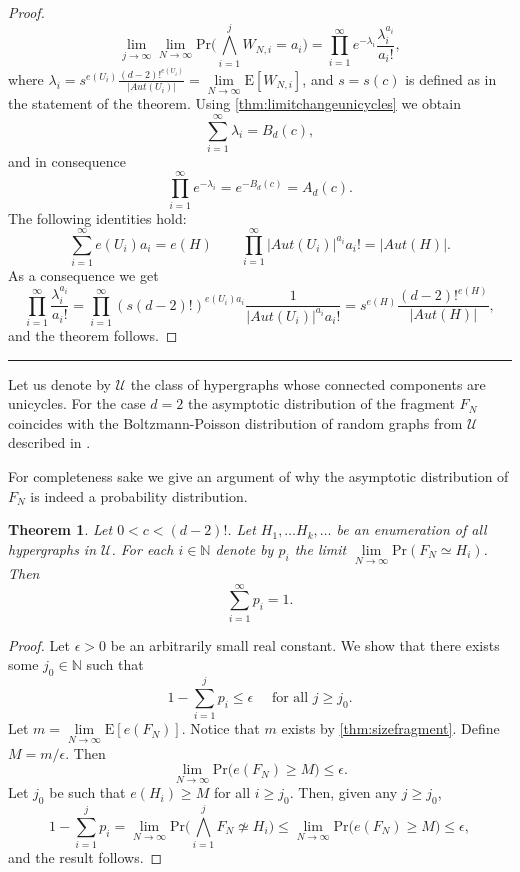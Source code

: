 \documentclass[11pt,notitlepage,a4paper]{article}
\newtheorem{theorem}{Theorem}[section]
\theoremstyle{definition}
\newcommand{\N}{\mathbb{N}}
\newcommand{\LN}{\lim\limits_{N\to \infty}}
\begin{document}
\begin{proof}
	\[
	\lim\limits_{j\to \infty}
	\LN \mathrm{Pr}\big( \bigwedge_{i=1}^j W_{N,i}=a_i\big)=
	\prod_{i=1}^\infty e^{-\lambda_i} \frac{\lambda_i^{a_i}}{a_i!},
	\]
	where $\lambda_i=s^{e(U_i)}\frac{(d-2)!^{e(U_i)}}{|Aut(U_i)|}= 
	\LN \mathrm{E}[W_{N,i}]$, and $s=s(c)$ is defined as in the statement 
	of the theorem. Using \cref{thm:limitchangeunicycles} we obtain
	\[
	\sum_{i=1}^{\infty} \lambda_i = B_d(c),
	\]
	and in consequence 
	\[
	\prod_{i=1}^\infty e^{-\lambda_i}= e^{-B_d(c)}=A_d(c).
	\]
	The following identities hold:
	\[
	\sum_{i=1}^\infty e(U_i)a_i = e(H) \qquad 
	\prod_{i=1}^{\infty} |Aut(U_i)|^{a_i} a_i!= |Aut(H)|.
	\]
	As a consequence we get
	\[
	\prod_{i=1}^\infty \frac{\lambda_i^{a_i}}{a_i!}=
	\prod_{i=1}^\infty (s(d-2)!)^{e(U_i)a_i} 
	\frac{1}{|Aut(U_i)|^{a_i}a_i!}=
	s^{e(H)}\frac{(d-2)!^{e(H)}}{|Aut(H)|},
	\]
	and the theorem follows. 
\end{proof}
	\noindent\rule{2cm}{0.4pt}\par
Let us denote by $\mathcal{U}$ the class of hypergraphs
whose connected components are unicycles. For the case $d=2$ 
the asymptotic distribution of the fragment $F_N$ coincides with
the Boltzmann-Poisson distribution of random graphs from $\mathcal{U}$
described in \cite{mcdiarmid2009random}.
\par
For completeness sake we give an argument of why the asymptotic distribution
of $F_N$ is indeed a probability distribution.  



\begin{theorem} \label{thm:limitdistribution}
	Let $0<c<(d-2)!$. 
	Let $H_1, \dots H_k, \dots$ be an enumeration of all hypergraphs
	in $\mathcal{U}$. For each $i\in \N$ 
	denote by $p_i$ the limit $\LN \mathrm{Pr}(F_N \simeq H_i)$. Then
	\[
	\sum_{i=1}^\infty p_i = 1.	
	\]
\end{theorem}
\begin{proof}
	Let $\epsilon>0$ be an arbitrarily small real constant. We show that 
	there exists some $j_0\in \N$ such that
	\[
	1- \sum_{i=1}^j p_i \leq \epsilon \quad \text{ for all } j\geq j_0.	
	\]	
	Let $m=\LN \mathrm{E}[e(F_N)]$. Notice that $m$ exists by \cref{thm:sizefragment}.
	Define $M=m/\epsilon$. Then 
	\[
	\LN \mathrm{Pr}\big(e(F_N)\geq M\big)\leq \epsilon.
	\]
	Let $j_0$ be such that $e(H_i)\geq M$ for all $i\geq j_0$. 
	Then, given any $j\geq j_0$, 
	\[
	1 - \sum_{i=1}^j p_i = \LN \mathrm{Pr}\big(
	\bigwedge_{i=1}^j F_N \not\simeq H_i\big) \leq
	\LN \mathrm{Pr}\big(
	e(F_N) \geq M \big)\leq \epsilon, 	
	\]	
	and the result follows. 
\end{proof}
\end{document}
